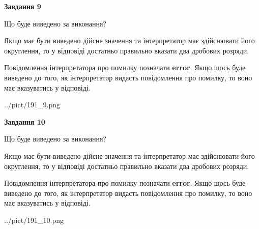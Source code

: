 \documentclass[12pt, ukrainian]{article}
\begin{document}
{\begin {Large}
{\begin {center}\textbf{Завдання 9}\end {center}}\par
Що буде виведено за виконання? \par

Якщо має бути виведено дійсне значення та інтерпретатор має здійснювати його округлення, 
то у відповіді достатньо правильно вказати два дробових розряди.

Повідомлення інтерпретатора про помилку позначати \textbf{error}.
Якщо щось буде виведено до того, як інтерпретатор видасть повідомлення про помилку, 
то воно має вказуватись у відповіді. \par

\begin{center}
	{../pict/191_9.png}
\end{center}
\newpage

{\begin {center}\textbf{Завдання 10}\end {center}}\par
Що буде виведено за виконання? \par

Якщо має бути виведено дійсне значення та інтерпретатор має здійснювати його округлення, 
то у відповіді достатньо правильно вказати два дробових розряди.

Повідомлення інтерпретатора про помилку позначати \textbf{error}.
Якщо щось буде виведено до того, як інтерпретатор видасть повідомлення про помилку, 
то воно має вказуватись у відповіді. \par

\begin{center}
	{../pict/191_10.png}
\end{center}
\newpage

\end {Large}}
\end{document}
